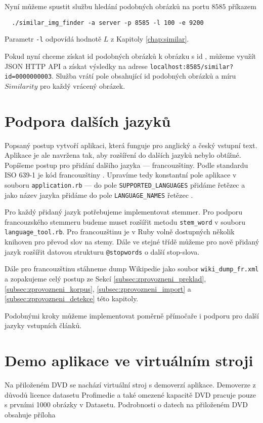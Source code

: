 Nyní můžeme spustit službu hledání podobných obrázků na portu $8585$ příkazem

\begin{lstlisting}
  ./similar_img_finder -a server -p 8585 -l 100 -e 9200
\end{lstlisting}

Parametr \lstinline{-l} odpovídá hodnotě $L$ z Kapitoly \ref{chap:similar}.

Pokud nyní chceme získat id podobných obrázků k obrázku s id , můžeme využít JSON HTTP API a získat výsledky na adrese \lstinline{localhost:8585/similar?id=0000000003}. Služba vrátí pole obsahující id podobných obrázků a míru $Similarity$ pro každý vrácený obrázek.

\section{Podpora dalších jazyků}

Popsaný postup vytvoří aplikaci, která funguje pro anglický a český vstupní text. Aplikace je ale navržena tak, aby rozšíření do dalších jazyků nebylo obtížné. Popíšeme postup pro přidání dalšího jazyka --- francouzštiny. Podle standardu ISO 639-1 je kód francouzštiny . Upravíme tedy konstantní pole aplikace v souboru \lstinline{application.rb} --- do pole \lstinline{SUPPORTED_LANGUAGES} přidáme řetězec  a jako název jazyka přidáme do pole \lstinline{LANGUAGE_NAMES} řetězec .

Pro každý přidaný jazyk potřebujeme implementovat stemmer. Pro podporu francouzského stemmeru budeme muset rozšířit metodu \lstinline{stem_word} v souboru \lstinline{language_tool.rb}. Pro francouzštinu je v Ruby volně dostupných několik knihoven pro převod slov na stemy. Dále ve stejné třídě můžeme pro nově přidaný jazyk rozšířit datovou strukturu \lstinline{@stopwords} o další stop-slova.

Dále pro francouzštinu stáhneme dump Wikipedie jako soubor \lstinline{wiki_dump_fr.xml} a zopakujeme celý postup ze Sekcí \ref{subsec:zprovozneni_preklad}, \ref{subsec:zprovozneni_korpus}, \ref{subsec:zprovozneni_import} a \ref{subsec:zprovozneni_detekce} této kapitoly.

Podobnými kroky můžeme implementovat poměrně přímočaře i podporu pro další jazyky vstupních článků.

\section{Demo aplikace ve virtuálním stroji}

Na přiloženém DVD se nachází virtuální stroj s demoverzí aplikace. Demoverze z důvodů licence datasetu Profimedie a také omezené kapacitě DVD pracuje pouze s prvními 1000 obrázky v Datasetu. Podrobnosti o datech na přiloženém DVD obsahuje příloha 








